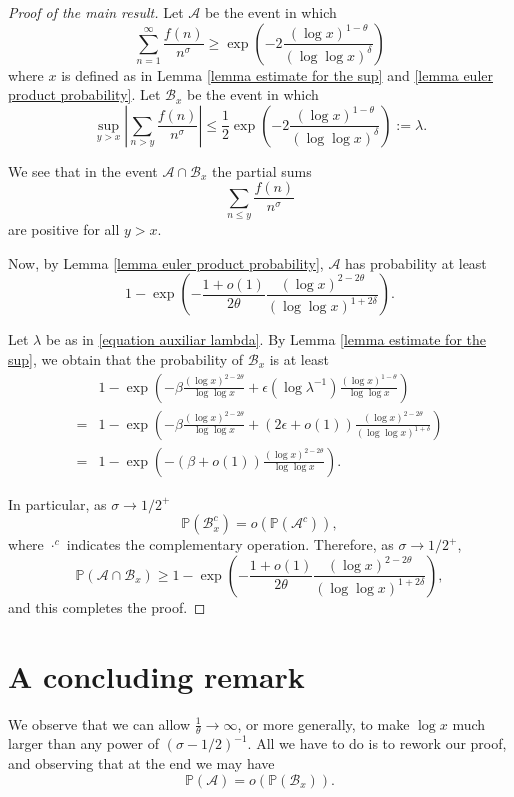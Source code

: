 \documentclass[reqno0,12pt]{amsart}
\theoremstyle{remark}
\newcommand{\PP}{\mathbb{P}}
\begin{document}
\begin{proof}[Proof of the main result] Let $\mathcal{A}$ be the event in which
$$\sum_{n=1}^\infty\frac{f(n)}{n^\sigma}\geq \exp\left(-2\frac{(\log x)^{1-\theta}}{(\log\log x)^{\delta}}\right)$$
where $x$ is defined as in Lemma \ref{lemma estimate for the sup} and \ref{lemma euler product probability}. Let $\mathcal{B}_x$ be the event in which
\begin{equation}\label{equation auxiliar lambda}
\sup_{y>x}\left|\sum_{n>y}\frac{f(n)}{n^\sigma}\right|\leq \frac{1}{2}\exp\left(-2\frac{(\log x)^{1-\theta}}{(\log\log x)^{\delta}}\right):=\lambda.
\end{equation}

We see that in the event $\mathcal{A}\cap\mathcal{B}_x$ the partial sums
$$\sum_{n\leq y}\frac{f(n)}{n^\sigma}$$
are positive for all $y>x$.
 
Now, by Lemma \ref{lemma euler product probability}, $\mathcal{A}$ has probability at least
$$1-\exp\left(-\frac{1+o(1)}{2\theta}\frac{(\log x)^{2-2\theta}}{(\log\log x)^{1+2\delta}}\right).$$

Let $\lambda$ be as in \eqref{equation auxiliar lambda}. By Lemma \ref{lemma estimate for the sup}, we obtain that the probability of $\mathcal{B}_x$ is at least
\begin{align*}
&1-\exp\left(-\beta \frac{(\log x)^{2-2\theta}}{\log\log x}+\epsilon(\log \lambda^{-1})\frac{(\log x)^{1-\theta}}{\log\log x} \right)\\
=&1-\exp\left(-\beta \frac{(\log x)^{2-2\theta}}{\log\log x}+(2\epsilon+o(1))\frac{(\log x)^{2-2\theta}}{(\log\log x)^{1+\delta}} \right)\\
=&1-\exp\left(-(\beta+o(1)) \frac{(\log x)^{2-2\theta}}{\log\log x}\right).
\end{align*}

In particular, as $\sigma\to1/2^+$
$$\PP(\mathcal{B}_x^c)=o(\PP(\mathcal{A}^c)),$$
where $\cdot^c$ indicates the complementary operation.
Therefore, as $\sigma\to 1/2^+$, 
$$\PP(\mathcal{A}\cap\mathcal{B}_x)\geq 1-\exp\left(-\frac{1+o(1)}{2\theta}\frac{(\log x)^{2-2\theta}}{(\log\log x)^{1+2\delta}}\right),$$
and this completes the proof.
\end{proof}

\section{A concluding remark}

We observe that we can allow $\frac{1}{\theta}\to\infty$, or more generally, to make $\log x$ much larger than any power of 
$(\sigma-1/2)^{-1}$. All we have to do is to rework our proof, and observing that at the end we may have
$$\PP(\mathcal{A})=o(\PP(\mathcal{B}_x)).$$
\end{document}
